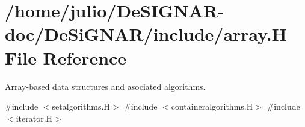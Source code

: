 \hypertarget{array_8_h}{}\section{/home/julio/\+De\+S\+I\+G\+N\+A\+R-\/doc/\+De\+Si\+G\+N\+A\+R/include/array.H File Reference}
\label{array_8_h}


Array-\/based data structures and asociated algorithms.  


{\ttfamily \#include $<$setalgorithms.\+H$>$}\newline
{\ttfamily \#include $<$containeralgorithms.\+H$>$}\newline
{\ttfamily \#include $<$iterator.\+H$>$}\newline
